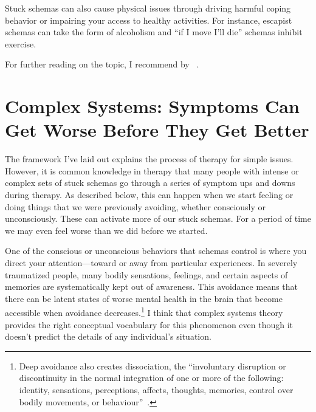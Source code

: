 \documentclass[11pt,oneside]{book}
\let\cite\parencite
\newcommand{\prosecite}[1]{\citetitle{#1} by \citefullauthor{#1}~\cite{#1}}
\begin{document}
Stuck schemas can also cause physical issues through driving harmful coping behavior or impairing your access to healthy activities. For instance, escapist schemas can take the form of alcoholism and \enquote{if I move I'll die} schemas inhibit exercise.

For further reading on the topic, I recommend \prosecite{berghPsychogenic}.

\section{Complex Systems: Symptoms Can Get Worse Before They Get Better}
\label{sec:complex}
The framework I've laid out explains the process of therapy for simple issues. However, it is common knowledge in therapy that many people with intense or complex sets of stuck schemas go through a series of symptom ups and downs during therapy. As described below, this can happen when we start feeling or doing things that we were previously avoiding, whether consciously or unconsciously. These can activate more of our stuck schemas. For a period of time we may even feel worse than we did before we started.

One of the conscious or unconscious behaviors that schemas control is where you direct your attention---toward or away from particular experiences. In severely traumatized people, many bodily sensations, feelings, and certain aspects of memories are systematically kept out of awareness. This avoidance means that there can be latent states of worse mental health in the brain that become accessible when avoidance decreases.\footnote{Deep avoidance also creates dissociation, the \enquote{involuntary disruption or discontinuity in the normal integration of one or more of the following: identity, sensations, perceptions, affects, thoughts, memories, control over bodily movements, or behaviour}~\cite[sec. Dissociative disorders]{icd11}.} I think that complex systems theory provides the right conceptual vocabulary for this phenomenon even though it doesn't predict the details of any individual's situation.
\end{document}
